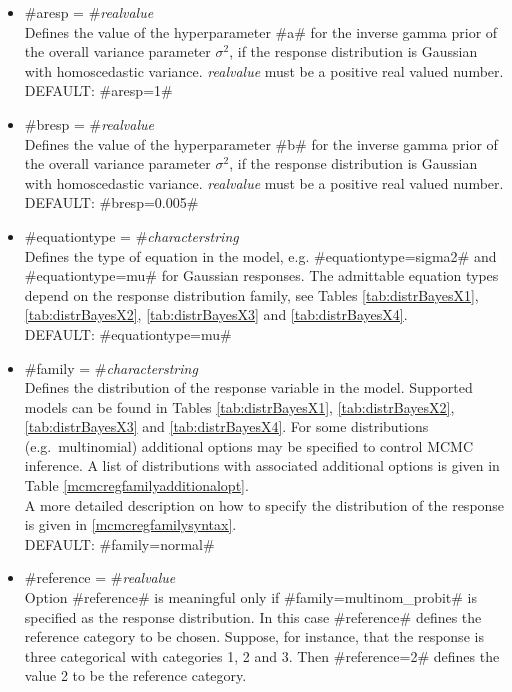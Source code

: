 \begin{itemize}
\item #aresp = #{\em realvalue } \\
Defines the value of the hyperparameter #a# for the inverse gamma
prior of the overall variance parameter $\sigma^2$, if the
response distribution is Gaussian with homoscedastic variance.
{\em realvalue} must be a positive real valued number. \\
DEFAULT: #aresp=1#

\item #bresp = #{\em realvalue } \\
Defines the value of the hyperparameter #b# for the inverse gamma
prior of the overall variance parameter $\sigma^2$, if the
response distribution is Gaussian with homoscedastic variance.
{\em realvalue} must be a positive real valued number. \\
DEFAULT: #bresp=0.005#
\item #equationtype = #{\em characterstring} \\
Defines the type of equation in the model, e.g. #equationtype=sigma2# and
 #equationtype=mu# for Gaussian responses. The admittable equation types depend on the response
 distribution family, see Tables \ref{tab:distrBayesX1}, \ref{tab:distrBayesX2}, \ref{tab:distrBayesX3}
and \ref{tab:distrBayesX4}. \\
DEFAULT: #equationtype=mu#
 \item #family = #{\em characterstring } \\
Defines the distribution of the response variable in the model.
Supported models can be found in Tables \ref{tab:distrBayesX1}, \ref{tab:distrBayesX2}, \ref{tab:distrBayesX3}
and \ref{tab:distrBayesX4}.
For some distributions
(e.g.~multinomial) additional options may be specified to control
MCMC inference.
A list of distributions with associated additional options is given in Table \ref{mcmcregfamilyadditionalopt}.  \\
A more detailed description on how to specify the
distribution of the response is given in \autoref{mcmcregfamilysyntax}. \\
DEFAULT: #family=normal#

\item #reference = #{\em realvalue} \\
Option #reference# is meaningful only if #family=multinom_probit# is
specified as the response distribution. In this case #reference#
defines the reference category to be chosen. Suppose, for
instance, that the response is three categorical with categories
1, 2 and 3. Then #reference=2# defines the value 2 to be the
reference category.
\end{itemize}

